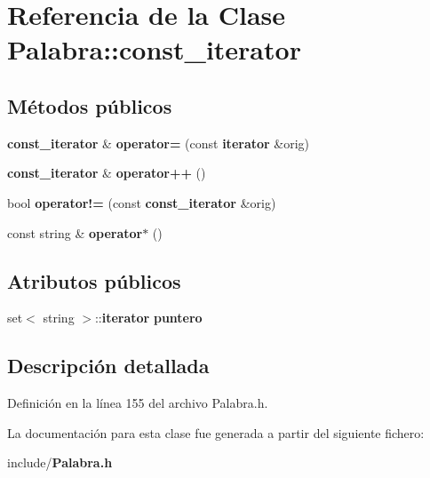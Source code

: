 \section{Referencia de la Clase Palabra\-:\-:const\-\_\-iterator}
\label{classPalabra_1_1const__iterator}
\subsection*{Métodos públicos}
\begin{DoxyCompactItemize}
\item 
{\bf const\-\_\-iterator} \& {\bfseries operator=} (const {\bf iterator} \&orig)\label{classPalabra_1_1const__iterator_ae54101b3561239d6889eb37f93d1433c}

\item 
{\bf const\-\_\-iterator} \& {\bfseries operator++} ()\label{classPalabra_1_1const__iterator_ab0eaff6ee74c5f44ff33a8b71fea2872}

\item 
bool {\bfseries operator!=} (const {\bf const\-\_\-iterator} \&orig)\label{classPalabra_1_1const__iterator_ae2468040441e957c59b62ed312d0ddd6}

\item 
const string \& {\bfseries operator$\ast$} ()\label{classPalabra_1_1const__iterator_a167f5ef4402b279524dd13830d98ef9e}

\end{DoxyCompactItemize}
\subsection*{Atributos públicos}
\begin{DoxyCompactItemize}
\item 
set$<$ string $>$\-::{\bf iterator} {\bfseries puntero}\label{classPalabra_1_1const__iterator_abe3ab4040f0f7821ff414eaef6c485b4}

\end{DoxyCompactItemize}


\subsection{Descripción detallada}


Definición en la línea 155 del archivo Palabra.\-h.



La documentación para esta clase fue generada a partir del siguiente fichero\-:\begin{DoxyCompactItemize}
\item 
include/{\bf Palabra.\-h}\end{DoxyCompactItemize}
